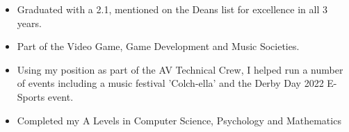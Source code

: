 \documentclass[10pt,a4paper,ragged2e,withhyper]{altacv}
\begin{document}

%
%
%
%
%
%
%
%


\begin{itemize}
	\item Graduated with a 2.1, mentioned on the Deans list for excellence in all 3 years.
	\item Part of the Video Game, Game Development and Music Societies.
	\item Using my position as part of the AV Technical Crew, I helped run a number of events including a music festival 'Colch-ella' and the Derby Day 2022 E-Sports event.
\end{itemize}


\divider


\begin{itemize}
	\item Completed my A Levels in Computer Science, Psychology and Mathematics
\end{itemize}



\divider

\end{document}
